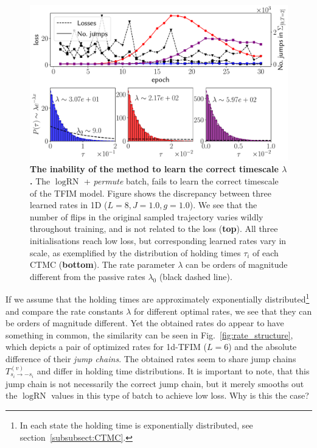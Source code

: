 \begin{figure}[t]
	\centering
	\includegraphics[width=\linewidth]{Chapter5/Figs/Vector/scale_blowup}
	\caption[The inability of the method to learn the correct timescale $\lambda$]{\textbf{The inability of the method to learn the correct timescale $\lambda$.} The $\log \text{RN}$ + \emph{permute} batch, fails to learn the correct timescale of the TFIM model. Figure shows the discrepancy between three learned rates in 1D ($L=8, J=1.0, g=1.0$). We see that the number of flips in the original sampled trajectory varies wildly throughout training, and is not related to the loss (\textbf{top}). All three initialisations reach low loss, but corresponding learned rates vary in scale, as exemplified by the distribution of holding times $\tau_i$ of each CTMC (\textbf{bottom}). The rate parameter $\lambda$ can be orders of magnitude different from the passive rates $\lambda_0$ (black dashed line).}
	\label{fig:scaleblowup}
\end{figure}
If we assume that the holding times are approximately exponentially distributed\footnote{In each state the holding time is exponentially distributed, see section~\ref{subsubsect:CTMC}.} and compare the rate constants $\lambda$ for different optimal rates, we see that they can be orders of magnitude different. Yet the obtained rates do appear to have something in common, the similarity can be seen in Fig.~\ref{fig:rate_structure}, which depicts a pair of optimized rates for 1d-TFIM ($L=6$) and the absolute difference of their \emph{jump chains}. The obtained rates seem to share jump chains $T^{(v)}_{s_i \rightarrow -s_i}$ and differ in holding time distributions. It is important to note, that this jump chain is not necessarily the correct jump chain, but it merely smooths out the $\log \text{RN}$ values in this type of batch to achieve low loss. Why is this the case?
